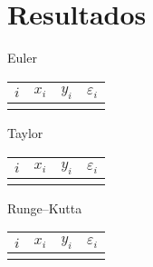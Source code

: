 \documentclass[english,spanish,Ce-table,Ce-theorem]{CabesHW}
\begin{document}
\section{Resultados}
Euler
\begin{tabular}{c|ccc}
$i$ & $x_i$ & $y_i$ & $\varepsilon_i$\\[.1em]
\hline\\[-.9em]

\end{tabular}

Taylor
\begin{tabular}{c|ccc}
$i$ & $x_i$ & $y_i$ & $\varepsilon_i$\\[.1em]
\hline\\[-.9em]

\end{tabular}

Runge--Kutta
\begin{tabular}{c|ccc}
$i$ & $x_i$ & $y_i$ & $\varepsilon_i$\\[.1em]
\hline\\[-.9em]

\end{tabular}
\end{document}

